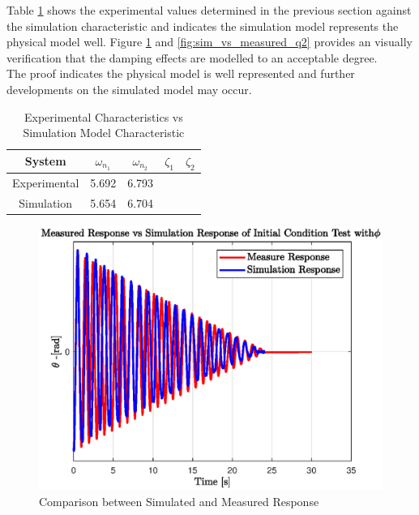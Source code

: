 Table \ref{table:experiment_vs_simulation} shows the experimental values determined in the previous section against the simulation characteristic and indicates the simulation model represents the physical model well. Figure \ref{fig:sim_vs_measured_q1} and \ref{fig:sim_vs_measured_q2} provides an visually verification that the damping effects are modelled to an acceptable degree.\\

The proof indicates the physical model is well represented and further developments on the simulated model may occur.\\



 
\begin{table}[]
	\centering
	\begin{tabular}{|c|c|c|c|c|}
		\hline
		System & $\omega_{n_{1}}$  & $\omega_{n_{2}}$  & $\zeta_{1}$ & $\zeta_{2}$ \\
		\hline
		\hline
		Experimental  & 5.692 &  6.793 & & \\
		\hline
		Simulation & 5.654 & 6.704 & & \\ 
		\hline
	\end{tabular}
	\caption{Experimental Characteristics vs Simulation Model Characteristic}
	\label{table:experiment_vs_simulation}
\end{table}

\begin{figure}[h]
	\centering
	\includegraphics[scale=1]{./figs/sim_vs_measured_q1.eps}
	\caption{Comparison between Simulated and Measured Response}
	\label{fig:sim_vs_measured_q1}
\end{figure}


